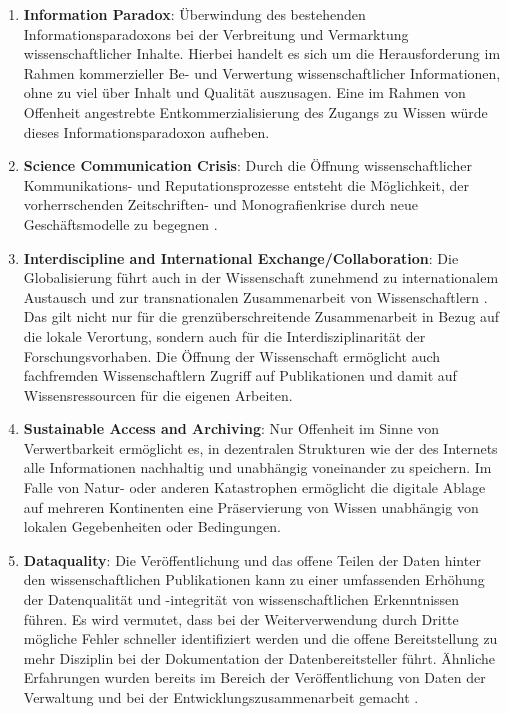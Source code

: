 \begin{enumerate}
\item \textbf{Information Paradox}: Überwindung des bestehenden Informationsparadoxons bei der Verbreitung und Vermarktung wissenschaftlicher Inhalte. Hierbei handelt es sich um die Herausforderung im Rahmen kommerzieller Be- und Verwertung wissenschaftlicher Informationen, ohne zu viel über Inhalt und Qualität auszusagen. Eine im Rahmen von Offenheit angestrebte Entkommerzialisierung des Zugangs zu Wissen würde dieses Informationsparadoxon aufheben.
\item \textbf{Science Communication Crisis}: Durch die Öffnung wissenschaftlicher Kommunikations- und Reputationsprozesse entsteht die Möglichkeit, der vorherrschenden Zeitschriften- und Monografienkrise durch neue Geschäftsmodelle zu begegnen \cite{Mueller_2010} \cite{Naeder_2010}.
\item \textbf{Interdiscipline and International Exchange/Collaboration}: Die Globalisierung führt auch in der Wissenschaft zunehmend zu internationalem Austausch und zur transnationalen Zusammenarbeit von Wissenschaftlern \cite{Waltman_2011}. Das gilt nicht nur für die grenzüberschreitende Zusammenarbeit in Bezug auf die lokale Verortung, sondern auch für die Interdisziplinarität der Forschungsvorhaben. Die Öffnung der Wissenschaft ermöglicht auch fachfremden Wissenschaftlern Zugriff auf Publikationen und damit auf Wissensressourcen für die eigenen Arbeiten.
\item \textbf{Sustainable Access and Archiving}: Nur Offenheit im Sinne von Verwertbarkeit ermöglicht es, in dezentralen Strukturen wie der des Internets alle Informationen nachhaltig und unabhängig voneinander zu speichern. Im Falle von Natur- oder anderen Katastrophen ermöglicht die digitale Ablage auf mehreren Kontinenten eine Präservierung von Wissen unabhängig von lokalen Gegebenheiten oder Bedingungen.
\item \textbf{Dataquality}: Die Veröffentlichung und das offene Teilen der Daten hinter den wissenschaftlichen Publikationen kann zu einer umfassenden Erhöhung der Datenqualität und -integrität von wissenschaftlichen Erkenntnissen führen. Es wird vermutet, dass bei der Weiterverwendung durch Dritte mögliche Fehler schneller identifiziert werden und die offene Bereitstellung zu mehr Disziplin bei der Dokumentation der Datenbereitsteller führt. Ähnliche Erfahrungen wurden bereits im Bereich der Veröffentlichung von Daten der Verwaltung und bei der Entwicklungszusammenarbeit gemacht \cite{Heise_2014}.
\end{enumerate}

